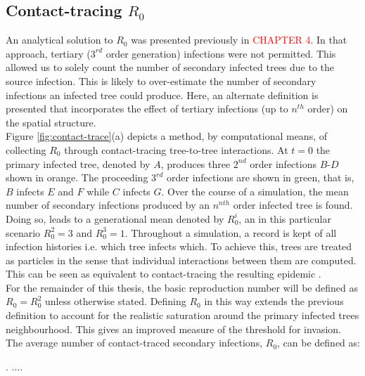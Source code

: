 \label{ch5:dispersal-model}

\subsection{Contact-tracing $R_0$}

An analytical solution to $R_0$ was presented previously in \textcolor{red}{CHAPTER 4}. %
In that approach, tertiary ($3^{rd}$ order generation) infections were not permitted. %
This allowed us to solely count the number of secondary infected trees due to the source infection. %
This is likely to over-estimate the number of secondary infections an infected tree could produce. %
Here, an alternate definition is presented that incorporates the effect of tertiary infections %
(up to $n^{th}$ order)  on the spatial structure.\\

Figure \ref{fig:contact-trace}(a) depicts a method, by computational means, of collecting $R_0$ %
through contact-tracing tree-to-tree interactions. %
At $t=0$ the primary infected tree, denoted by $A$, produces three $2^{nd}$ order infections %
$B$-$D$ shown in orange. %
The proceeding $3^{rd}$ order infections are shown in green, that is, $B$ infects $E$ and $F$ while $C$ infects $G$. %
Over the course of a simulation, the mean number of secondary infections produced by an $n^{nth}$ order infected tree is found. %
Doing so, leads to a generational mean denoted by $R^i_0$, an in this particular scenario $R^2_0=3$ and $R^3_0=1$. 
Throughout a simulation, a record is kept of all infection histories i.e. which tree infects which. 
To achieve this, trees are treated as particles in the sense that individual interactions between them are computed. 
This can be seen as equivalent to contact-tracing the resulting epidemic \cite{eames2003contact}. \\

For the remainder of this thesis, the basic reproduction number will be defined as $R_0=R^2_0$ unless otherwise stated. 
Defining $R_0$ in this way extends the previous definition to account for the realistic %
saturation around the primary infected trees neighbourhood. This gives an improved measure %
of the threshold for invasion. The average number of contact-traced secondary infections, $R_0$, can be defined as:
\begin{defn}. %
....
\label{def:R0_contact_traced}
\end{defn}

